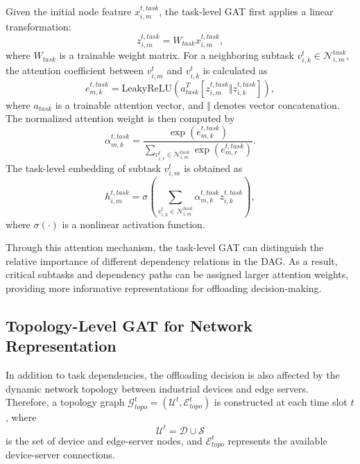 \documentclass[conference]{IEEEtran}
\begin{document}
Given the initial node feature $x_{i,m}^{t,task}$, the task-level GAT first applies a linear transformation:
\begin{equation}
z_{i,m}^{t,task}
=
W_{task}x_{i,m}^{t,task},
\end{equation}
where $W_{task}$ is a trainable weight matrix. For a neighboring subtask $v_{i,k}^t\in\mathcal{N}_{i,m}^{task}$, the attention coefficient between $v_{i,m}^t$ and $v_{i,k}^t$ is calculated as
\begin{equation}
e_{m,k}^{t,task}
=
\mathrm{LeakyReLU}
\left(
a_{task}^{T}
[z_{i,m}^{t,task} \Vert z_{i,k}^{t,task}]
\right),
\end{equation}
where $a_{task}$ is a trainable attention vector, and $\Vert$ denotes vector concatenation. The normalized attention weight is then computed by
\begin{equation}
\alpha_{m,k}^{t,task}
=
\frac{
\exp(e_{m,k}^{t,task})
}{
\sum_{v_{i,r}^t\in\mathcal{N}_{i,m}^{task}}
\exp(e_{m,r}^{t,task})
}.
\end{equation}
The task-level embedding of subtask $v_{i,m}^t$ is obtained as
\begin{equation}
h_{i,m}^{t,task}
=
\sigma
\left(
\sum_{v_{i,k}^t\in\mathcal{N}_{i,m}^{task}}
\alpha_{m,k}^{t,task}
z_{i,k}^{t,task}
\right),
\end{equation}
where $\sigma(\cdot)$ is a nonlinear activation function.

Through this attention mechanism, the task-level GAT can distinguish the relative importance of different dependency relations in the DAG. As a result, critical subtasks and dependency paths can be assigned larger attention weights, providing more informative representations for offloading decision-making.

\subsection{Topology-Level GAT for Network Representation}

In addition to task dependencies, the offloading decision is also affected by the dynamic network topology between industrial devices and edge servers. Therefore, a topology graph $\mathcal{G}_{topo}^t=(\mathcal{U}^t,\mathcal{E}_{topo}^t)$ is constructed at each time slot $t$, where
\begin{equation}
\mathcal{U}^t=\mathcal{D}\cup\mathcal{S}
\end{equation}
is the set of device and edge-server nodes, and $\mathcal{E}_{topo}^t$ represents the available device-server connections.
\end{document}
